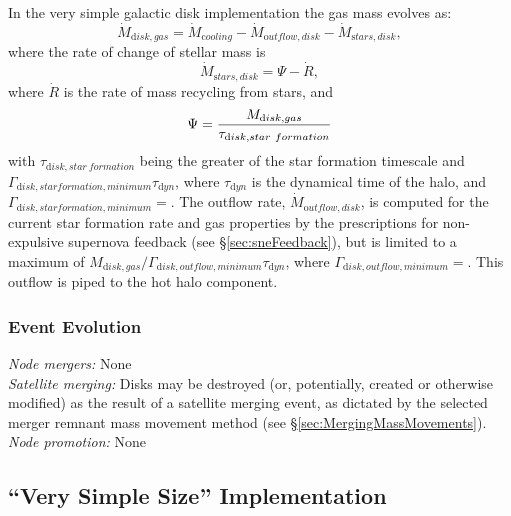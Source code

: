 In the very simple galactic disk implementation the gas mass evolves as:
\begin{equation}
 \dot{M}_{\mathrm disk, gas} = \dot{M}_{\mathrm cooling} - \dot{M}_{\mathrm outflow, disk} - \dot{M}_{\mathrm stars, disk},
\end{equation}
where the rate of change of stellar mass is
\begin{equation}
 \dot{M}_{\mathrm stars, disk} = \Psi - \dot{R},
\end{equation}
where $\dot{R}$ is the rate of mass recycling from stars, and
\begin{equation}
 \Psi = {M_{\mathrm disk, gas} \over \tau_{\mathrm disk, star~formation}}
\end{equation}
with $\tau_{\mathrm disk, star~formation}$ being the greater of the star formation timescale and $\Gamma_{\mathrm disk, star formation, minimum} \tau_{\mathrm dyn}$, where $\tau_{\mathrm dyn}$ is the dynamical time of the halo, and $\Gamma_{\mathrm disk, star formation, minimum}=${\normalfont \ttfamily [diskStarFormationTimescaleMinimum]}. The outflow rate, $\dot{M}_{\mathrm outflow, disk}$, is computed for the current star formation rate and gas properties by the prescriptions for non-expulsive supernova feedback (see \S\ref{sec:sneFeedback}), but is limited to a maximum of $M_{\mathrm disk, gas}/ \Gamma_{\mathrm disk, outflow, minimum} \tau_{\mathrm dyn}$, where $\Gamma_{\mathrm disk, outflow, minimum}=${\normalfont \ttfamily [diskOutflowTimescaleMinimum]}. This outflow is piped to the hot halo component.

\subsubsection{Event Evolution}

\noindent\emph{Node mergers:} None\\

\noindent\emph{Satellite merging:} Disks may be destroyed (or, potentially, created or otherwise modified) as the result of a satellite merging event, as dictated by the selected merger remnant mass movement method (see \S\ref{sec:MergingMassMovements}).\\

\noindent\emph{Node promotion:} None\\

\subsection{``Very Simple Size'' Implementation}

